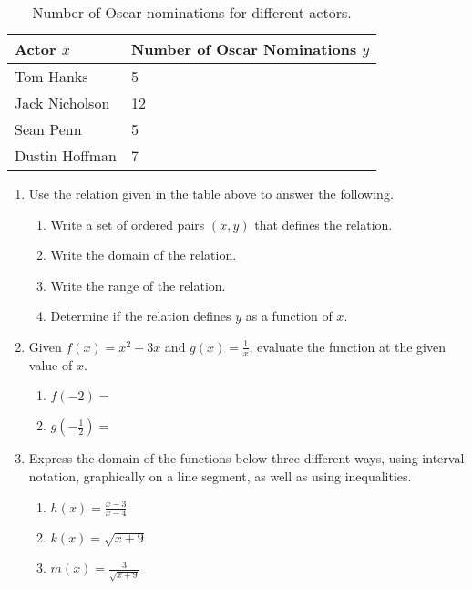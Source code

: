 

\begin{table}[h]
  \center%
  \begin{tabular}{|l|l|}
    \hline
    \textbf{Actor $x$} & \textbf{Number of Oscar Nominations $y$} \\ \hline
    Tom Hanks          & 5                                        \\ \hline
    Jack Nicholson     & 12                                       \\ \hline
    Sean Penn          & 5                                        \\ \hline
    Dustin Hoffman     & 7                                        \\ \hline
  \end{tabular}
  \label{table:oscarNominations}
  \caption{Number of Oscar nominations for different actors.}
\end{table}



\begin{enumerate}
\item Use the relation given in the table above to answer the following.


\begin{enumerate}
\item Write a set of ordered pairs $(x,y)$ that defines the relation.\vfill
\item Write the domain of the relation.\vfill
\item Write the range of the relation.\vfill
\item Determine if the relation defines $y$ as a function of $x$.
\end{enumerate}
\vfill

\newpage
\item Given $f(x)=x^2+3x$ and $\displaystyle g(x)=\frac{1}{x}$, evaluate the function at the given value of $x$.
\begin{enumerate}
\item $f\left(-2\right)=$
  \vfill
\item $\displaystyle g\left(-\frac{1}{2}\right)=$
  \vfill
\end{enumerate}




\item Express the domain of the functions below three different ways,
  using interval notation, graphically on a line segment, as well as
  using inequalities.
  \begin{enumerate}
  \item $\displaystyle h(x)=\frac{x-3}{x-4}$
    \vfill
  \item $k(x)=\sqrt{x+9}$
    \vfill
  \item $\displaystyle m(x)=\frac{3}{\sqrt{x+9}}$
    \vfill
  \end{enumerate}





\end{enumerate}



